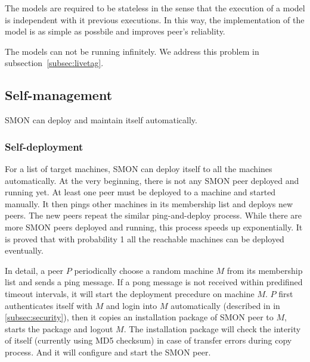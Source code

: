 {The models are required to be stateless in the sense that
the execution of a model is independent with it previous
executions. In this way, the implementation of the model is
as simple as possbile and improves peer's reliablity.



The models can not be running infinitely. We address this
problem in subsection~\ref{subsec:livetag}.
}

\subsection{Self-management}

SMON can deploy and maintain itself automatically.

\subsubsection*{Self-deployment}

For a list of target machines, SMON can deploy itself to all
the machines automatically. At the very beginning, there is
not any SMON peer deployed and running yet. At least one
peer must be deployed to a machine and started manually. It
then pings other machines in its membership list and deploys
new peers. The new peers repeat the similar ping-and-deploy
process. While there are more SMON peers deployed and
running, this process speeds up exponentially. It is proved
that with probability 1 all the reachable machines can be
deployed eventually\cite{Eugster2004}.

In detail, a peer $P$ periodically choose a random machine
$M$ from its membership list and sends a ping message. If a
pong message is not received within predifined timeout
intervals, it will start the deployment precedure on machine
$M$. $P$ first authenticates itself with $M$ and login into
$M$ automatically (described in in \ref{subsec:security}),
then it copies an installation package of SMON peer to $M$,
starts the package and logout $M$. The installation package
will check the interity of itself (currently using MD5
checksum) in case of transfer errors during copy process.
And it will configure and start the SMON peer.

